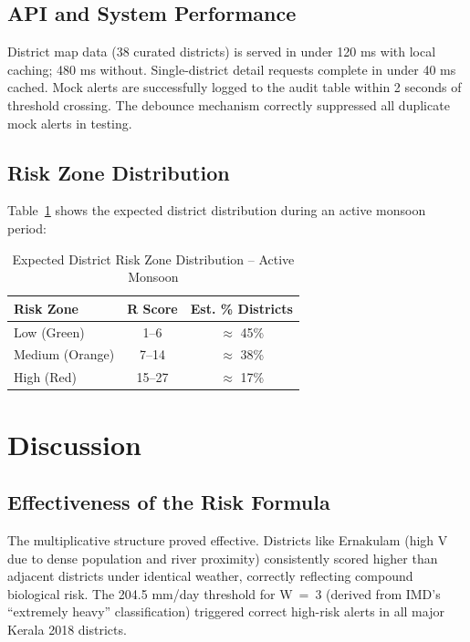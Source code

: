 \documentclass[12pt,a4paper]{report}
\begin{document}
\subsection{API and System Performance}

District map data (38 curated districts) is served in under 120 ms with local caching; 480 ms without. Single-district detail requests complete in under 40 ms cached. Mock alerts are successfully logged to the audit table within 2 seconds of threshold crossing. The debounce mechanism correctly suppressed all duplicate mock alerts in testing.

\subsection{Risk Zone Distribution}

Table~\ref{tab:risk_zones} shows the expected district distribution during an active monsoon period:

\begin{table}[H]
\centering
\caption{Expected District Risk Zone Distribution -- Active Monsoon}
\label{tab:risk_zones}
\begin{tabular}{|l|c|c|}
\hline
\textbf{Risk Zone} & \textbf{R Score} & \textbf{Est. \% Districts} \\ \hline
Low (Green)    & 1--6   & $\approx$ 45\% \\ \hline
Medium (Orange)& 7--14  & $\approx$ 38\% \\ \hline
High (Red)     & 15--27 & $\approx$ 17\% \\ \hline
\end{tabular}
\end{table}

\section{Discussion}

\subsection{Effectiveness of the Risk Formula}

The multiplicative structure proved effective. Districts like Ernakulam (high V due to dense population and river proximity) consistently scored higher than adjacent districts under identical weather, correctly reflecting compound biological risk. The 204.5 mm/day threshold for W~=~3 (derived from IMD's ``extremely heavy'' classification) triggered correct high-risk alerts in all major Kerala 2018 districts.
\end{document}
